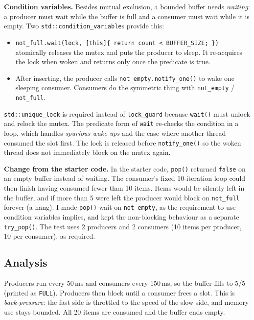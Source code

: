 \documentclass[11pt]{article}
\begin{document}
\textbf{Condition variables.} Besides mutual exclusion, a bounded buffer needs
\emph{waiting}: a producer must wait while the buffer is full and a consumer
must wait while it is empty. Two \texttt{std::condition\_variable}s provide
this:
\begin{itemize}
  \item \texttt{not\_full.wait(lock, [this]\{ return count < BUFFER\_SIZE; \})}
        atomically releases the mutex and puts the producer to sleep. It
        re-acquires the lock when woken and returns only once the predicate is
        true.
  \item After inserting, the producer calls \texttt{not\_empty.notify\_one()}
        to wake one sleeping consumer. Consumers do the symmetric thing with
        \texttt{not\_empty} / \texttt{not\_full}.
\end{itemize}
\texttt{std::unique\_lock} is required instead of \texttt{lock\_guard} because
\texttt{wait()} must unlock and relock the mutex. The predicate form of
\texttt{wait} re-checks the condition in a loop, which handles
\emph{spurious wake-ups} and the case where another thread consumed the slot
first. The lock is released before \texttt{notify\_one()} so the woken thread
does not immediately block on the mutex again.

\textbf{Change from the starter code.} In the starter code, \texttt{pop()}
returned \texttt{false} on an empty buffer instead of waiting. The consumer's
fixed 10-iteration loop could then finish having consumed fewer than 10
items. Items would be silently left in the buffer, and if more than 5 were
left the producer would block on \texttt{not\_full} forever (a hang). I made
\texttt{pop()} wait on \texttt{not\_empty}, as the requirement to use condition
variables implies, and kept the non-blocking behaviour as a separate
\texttt{try\_pop()}. The test uses 2 producers and 2 consumers (10 items per
producer, 10 per consumer), as required.

\subsection*{Analysis}
Producers run every 50\,ms and consumers every 150\,ms, so the buffer fills to
5/5 (printed as \texttt{FULL}). Producers then block until a consumer frees a
slot. This is \emph{back-pressure}: the fast side is throttled to the speed of
the slow side, and memory use stays bounded. All 20 items are consumed and the
buffer ends empty.
\end{document}
